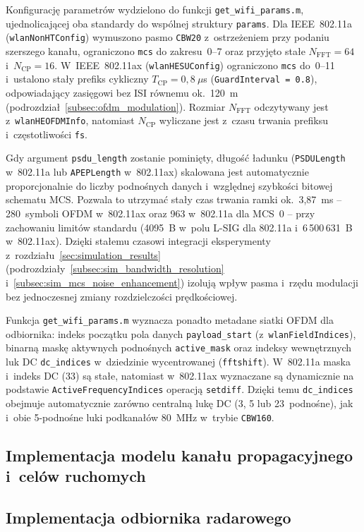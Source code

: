 Konfigurację parametrów wydzielono do funkcji \texttt{get\_wifi\_\allowbreak params.m}, ujednolicającej oba standardy do wspólnej struktury \texttt{params}. Dla IEEE~802.11a (\texttt{wlanNonHTConfig}) wymuszono pasmo \texttt{CBW20} z~ostrzeżeniem przy podaniu szerszego kanału, ograniczono \texttt{mcs} do zakresu~0--7 oraz przyjęto stałe $N_{\mathrm{FFT}} = 64$ i~$N_{\mathrm{CP}} = 16$. W~IEEE~802.11ax (\texttt{wlanHESUConfig}) ograniczono \texttt{mcs} do~0--11 i~ustalono stały prefiks cykliczny $T_{\mathrm{CP}} = 0{,}8~\mu$s (\texttt{GuardInterval = 0.8}), odpowiadający zasięgowi bez ISI równemu ok.~120~m (podrozdział~\ref{subsec:ofdm_modulation}). Rozmiar $N_{\mathrm{FFT}}$ odczytywany jest z~\texttt{wlanHEOFDMInfo}, natomiast $N_{\mathrm{CP}}$ wyliczane jest z~czasu trwania prefiksu i~częstotliwości \texttt{fs}.

Gdy argument \texttt{psdu\_length} zostanie pominięty, długość ładunku (\texttt{PSDULength} w~802.11a lub \texttt{APEPLength} w~802.11ax) skalowana jest automatycznie proporcjonalnie do liczby podnośnych danych i~względnej szybkości bitowej schematu MCS. Pozwala to utrzymać stały czas trwania ramki ok.~3,87~ms -- 280~symboli OFDM w~802.11ax oraz 963 w~802.11a dla MCS~0 -- przy zachowaniu limitów standardu (4095~B w~polu L-SIG dla 802.11a i~6\,500\,631~B w~802.11ax). Dzięki stałemu czasowi integracji eksperymenty z~rozdziału~\ref{sec:simulation_results} (podrozdziały~\ref{subsec:sim_bandwidth_resolution} i~\ref{subsec:sim_mcs_noise_enhancement}) izolują wpływ pasma i~rzędu modulacji bez jednoczesnej zmiany rozdzielczości prędkościowej.

Funkcja \texttt{get\_wifi\_\allowbreak params.m} wyznacza ponadto metadane siatki OFDM dla odbiornika: indeks początku pola danych \texttt{payload\_start} (z~\texttt{wlanFieldIndices}), binarną maskę aktywnych podnośnych \texttt{active\_mask} oraz indeksy wewnętrznych luk DC \texttt{dc\_indices} w~dziedzinie wycentrowanej (\texttt{fftshift}). W~802.11a maska i~indeks DC (33) są stałe, natomiast w~802.11ax wyznaczane są dynamicznie na podstawie \texttt{Active\allowbreak Frequency\allowbreak Indices} operacją \texttt{setdiff}. Dzięki temu \texttt{dc\_indices} obejmuje automatycznie zarówno centralną lukę DC (3, 5 lub 23~podnośne), jak i~obie 5-podnośne luki podkanałów 80~MHz w~trybie \texttt{CBW160}.

\subsection{Implementacja modelu kanału propagacyjnego i~celów ruchomych}
\label{subsec:channel_implementation}

\subsection{Implementacja odbiornika radarowego}
\label{subsec:receiver_implementation}
